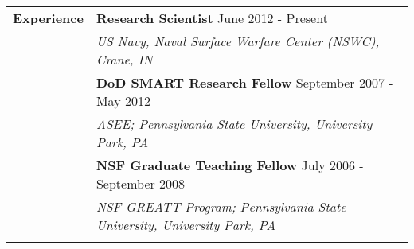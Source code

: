 \documentclass{article}[16pt]
\newlength{\lcolw}
\newlength{\rcolw}
\newlength{\hlcolw}
\begin{document}
\begin{tabular}{L{\hlcolw}  L{\rcolw}}
\textbf{\Large Experience} & \textbf{\large Research Scientist} \hfill {\large June 2012 - Present}  \\
& \textit{\large US Navy, Naval Surface Warfare Center (NSWC), Crane, IN} \vspace{0.1in} \\  
& \textbf{\large DoD SMART Research Fellow} \hfill {\large September 2007 - May 2012}  \\
& \textit{\large ASEE; Pennsylvania State University, University Park, PA} \vspace{0.1in} \\ 	
& \textbf{\large NSF Graduate Teaching Fellow} \hfill {\large July 2006 - September 2008}  \\
& \textit{\large NSF GREATT Program; Pennsylvania State University, University Park, PA} \vspace{0.1in} \\ 	
\hline \\ 
\end{tabular}
\end{document}
